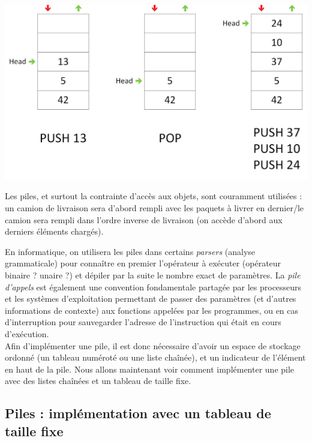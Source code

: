 \begin{center}
\includegraphics[scale=0.5]{Cours/Piles_2_Structure_Generale_Usage_pack_2.png}
\end{center}

\smallskip

Les piles, et surtout la contrainte d'accès aux objets, sont couramment utilisées : un camion de livraison sera d'abord rempli avec les paquets à livrer en dernier/le camion sera rempli dans l'ordre inverse de livraison (on accède d'abord aux derniers éléments chargés).

En informatique, on utilisera les piles dans certains \textit{parsers} (analyse grammaticale) pour connaître en premier l'opérateur à exécuter (opérateur binaire ? unaire ?) et dépiler par la suite le nombre exact de paramètres.
La \textit{pile d'appels} est également une convention fondamentale partagée par les processeurs et les systèmes d'exploitation permettant de passer des paramètres (et d'autres informations de contexte) aux fonctions appelées par les programmes, ou en cas d'interruption pour sauvegarder l'adresse de l'instruction qui était en cours d'exécution.\\

Afin d'implémenter une pile, il est donc nécessaire d'avoir un espace de stockage ordonné (un tableau numéroté ou une liste chaînée), et un indicateur de l'élément en haut de la pile.
Nous allons maintenant voir comment implémenter une pile avec des listes chaînées et un tableau de taille fixe.

\bigskip


\subsection{Piles : implémentation avec un tableau de taille fixe}

